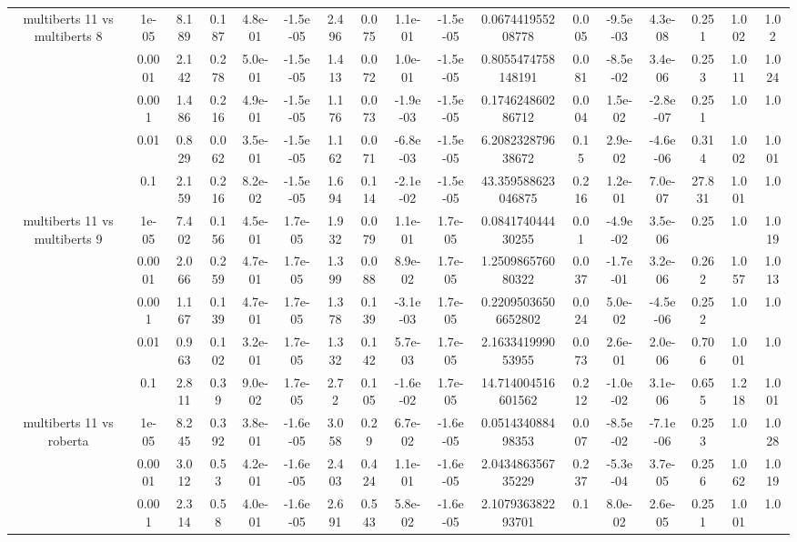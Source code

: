 \begin{tabular}{|c|c|c|c|c|c|c|c|c|c|c|c|c|c|c|c|c|}
\hline
\multirow{5}{*}{multiberts 11 vs multiberts 8} & 1e-05 & 8.189 & 0.187 & 4.8e-01 & -1.5e-05 & 2.496 & 0.075 & 1.1e-01 & -1.5e-05 & 0.067441955208778 & 0.005 & -9.5e-03 & 4.3e-08 & 0.251 & 1.002 & 1.02 \\
 & 0.0001 & 2.142 & 0.278 & 5.0e-01 & -1.5e-05 & 1.413 & 0.072 & 1.0e-01 & -1.5e-05 & 0.8055474758148191 & 0.081 & -8.5e-02 & 3.4e-06 & 0.253 & 1.011 & 1.024 \\
 & 0.001 & 1.486 & 0.216 & 4.9e-01 & -1.5e-05 & 1.176 & 0.073 & -1.9e-03 & -1.5e-05 & 0.174624860286712 & 0.004 & 1.5e-02 & -2.8e-07 & 0.251 & 1.0 & 1.0 \\
 & 0.01 & 0.829 & 0.062 & 3.5e-01 & -1.5e-05 & 1.162 & 0.071 & -6.8e-03 & -1.5e-05 & 6.208232879638672 & 0.15 & 2.9e-02 & -4.6e-06 & 0.314 & 1.002 & 1.001 \\
 & 0.1 & 2.159 & 0.216 & 8.2e-02 & -1.5e-05 & 1.694 & 0.114 & -2.1e-02 & -1.5e-05 & 43.359588623046875 & 0.216 & 1.2e-01 & 7.0e-07 & 27.831 & 1.001 & 1.0 \\
\hline
\multirow{5}{*}{multiberts 11 vs multiberts 9} & 1e-05 & 7.402 & 0.156 & 4.5e-01 & 1.7e-05 & 1.932 & 0.079 & 1.1e-01 & 1.7e-05 & 0.084174044430255 & 0.01 & -4.9e-02 & 3.5e-06 & 0.25 & 1.0 & 1.019 \\
 & 0.0001 & 2.066 & 0.259 & 4.7e-01 & 1.7e-05 & 1.399 & 0.088 & 8.9e-02 & 1.7e-05 & 1.250986576080322 & 0.037 & -1.7e-01 & 3.2e-06 & 0.262 & 1.057 & 1.013 \\
 & 0.001 & 1.167 & 0.139 & 4.7e-01 & 1.7e-05 & 1.378 & 0.139 & -3.1e-03 & 1.7e-05 & 0.22095036506652802 & 0.024 & 5.0e-02 & -4.5e-06 & 0.252 & 1.0 & 1.0 \\
 & 0.01 & 0.963 & 0.102 & 3.2e-01 & 1.7e-05 & 1.332 & 0.142 & 5.7e-03 & 1.7e-05 & 2.163341999053955 & 0.073 & 2.6e-01 & 2.0e-06 & 0.706 & 1.001 & 1.0 \\
 & 0.1 & 2.811 & 0.39 & 9.0e-02 & 1.7e-05 & 2.72 & 0.105 & -1.6e-02 & 1.7e-05 & 14.714004516601562 & 0.212 & -1.0e-02 & 3.1e-06 & 0.655 & 1.218 & 1.001 \\
\hline
\multirow{5}{*}{multiberts 11 vs roberta } & 1e-05 & 8.245 & 0.392 & 3.8e-01 & -1.6e-05 & 3.058 & 0.29 & 6.7e-02 & -1.6e-05 & 0.051434088498353 & 0.007 & -8.5e-02 & -7.1e-06 & 0.253 & 1.0 & 1.028 \\
 & 0.0001 & 3.012 & 0.53 & 4.2e-01 & -1.6e-05 & 2.403 & 0.424 & 1.1e-01 & -1.6e-05 & 2.043486356735229 & 0.237 & -5.3e-04 & 3.7e-05 & 0.256 & 1.062 & 1.019 \\
 & 0.001 & 2.314 & 0.58 & 4.0e-01 & -1.6e-05 & 2.691 & 0.543 & 5.8e-02 & -1.6e-05 & 2.107936382293701 & 0.1 & 8.0e-02 & 2.6e-05 & 0.251 & 1.001 & 1.0 \\

\end{tabular}
